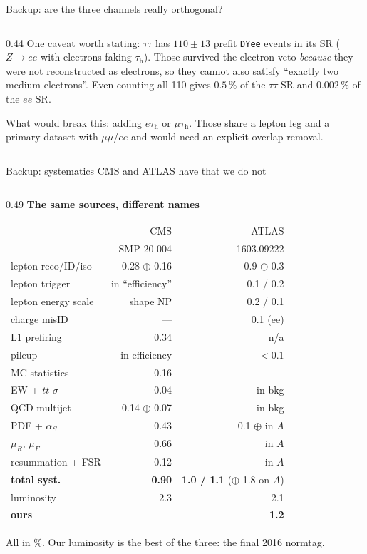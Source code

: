\documentclass[aspectratio=169,9pt,t]{beamer}
\newcommand{\tauh}{\ensuremath{\tau_{\mathrm{h}}}}
\begin{document}
\begin{frame}[noframenumbering]{Backup: are the three channels really orthogonal?}
\begin{columns}[T]
\begin{column}{0.44\textwidth}
\medskip
One caveat worth stating: $\tau\tau$ has $110 \pm 13$ prefit \texttt{DYee} events in its SR
($Z\to ee$ with electrons faking \tauh). Those survived the electron veto \emph{because} they were
not reconstructed as electrons, so they cannot also satisfy ``exactly two medium electrons''. Even
counting all 110 gives $0.5\,\%$ of the $\tau\tau$ SR and $0.002\,\%$ of the $ee$ SR.

\medskip
\alert{What would break this:} adding $e\tauh$ or $\mu\tauh$. Those share a lepton leg and a
primary dataset with $\mu\mu$/$ee$ and would need an explicit overlap removal.
\end{column}
\end{columns}
\end{frame}

\begin{frame}[noframenumbering]{Backup: systematics CMS and ATLAS have that we do not}
\begin{columns}[T]
\begin{column}{0.49\textwidth}\scriptsize
\textbf{The same sources, different names}
\begin{center}\scriptsize
\begin{tabular}{@{}lrr@{}}
\toprule
 & CMS & ATLAS \\
 & SMP-20-004 & 1603.09222 \\ \midrule
lepton reco/ID/iso & 0.28 $\oplus$ 0.16 & 0.9 $\oplus$ 0.3 \\
lepton trigger & in ``efficiency'' & 0.1 / 0.2 \\
lepton energy scale & shape NP & 0.2 / 0.1 \\
charge misID & --- & 0.1 (ee) \\
L1 prefiring & 0.34 & n/a \\
pileup & in efficiency & $<0.1$ \\
MC statistics & 0.16 & --- \\
EW + $t\bar t$ $\sigma$ & 0.04 & in bkg \\
QCD multijet & 0.14 $\oplus$ 0.07 & in bkg \\
PDF + $\alpha_S$ & 0.43 & 0.1 $\oplus$ in $A$ \\
$\mu_R$, $\mu_F$ & 0.66 & in $A$ \\
resummation + FSR & 0.12 & in $A$ \\ \midrule
\textbf{total syst.} & \textbf{0.90} & \textbf{1.0 / 1.1} ($\oplus$ 1.8 on $A$) \\
luminosity & 2.3 & 2.1 \\
\textcolor{good!60!black}{\textbf{ours}} & \multicolumn{2}{r}{\textcolor{good!60!black}{\textbf{1.2}}} \\
\bottomrule
\end{tabular}
\end{center}
{\scriptsize All in \%. Our luminosity is the best of the three: the final 2016 normtag.}
\end{column}


\end{columns}
\end{frame}
\end{document}
